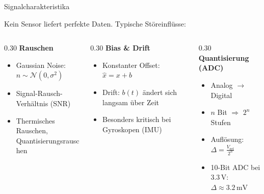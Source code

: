 \documentclass[%
  aspectratio=169,
  10pt
]{beamer}
\newcommand{\SI}[2]{#1\,\text{#2}}
\begin{document}
\begin{frame}{Signalcharakteristika}

Kein Sensor liefert perfekte Daten. Typische Störeinflüsse:

\vspace{2mm}
\begin{columns}[T]
  \begin{column}{0.30\textwidth}
    \textbf{Rauschen}
    \begin{itemize}
      \item Gaussian Noise:
            $n \sim \mathcal{N}(0, \sigma^2)$
      \item Signal-Rausch-Verhältnis (SNR)
      \item Thermisches Rauschen,\\Quantisierungsrauschen
    \end{itemize}
  \end{column}

  \begin{column}{0.30\textwidth}
    \textbf{Bias \& Drift}
    \begin{itemize}
      \item Konstanter Offset:\\
            $\hat{x} = x + b$
      \item Drift: $b(t)$ ändert sich
            langsam über Zeit
      \item Besonders kritisch bei\\
            Gyroskopen (IMU)
    \end{itemize}
  \end{column}

  \begin{column}{0.30\textwidth}
    \textbf{Quantisierung (ADC)}
    \begin{itemize}
      \item Analog $\rightarrow$ Digital
      \item $n$ Bit $\Rightarrow$ $2^n$ Stufen
      \item Auflösung:\\
            $\Delta = \frac{V_\mathrm{ref}}{2^n}$
      \item 10-Bit ADC bei $\SI{3.3}{V}$:\\
            $\Delta \approx \SI{3.2}{mV}$
    \end{itemize}
  \end{column}
\end{columns}

\end{frame}
\end{document}
